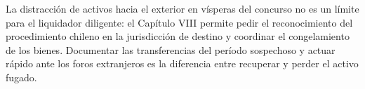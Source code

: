 \begin{practica}
La distracción de activos hacia el exterior en vísperas del concurso no es un límite para el
liquidador diligente: el Capítulo VIII permite pedir el reconocimiento del procedimiento chileno en
la jurisdicción de destino y coordinar el congelamiento de los bienes. Documentar las
transferencias del período sospechoso y actuar rápido ante los foros extranjeros es la diferencia
entre recuperar y perder el activo fugado.
\end{practica}
